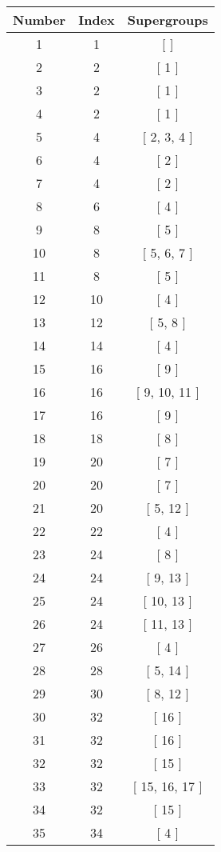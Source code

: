 \begin{center}
\begin{longtable}[H]{|| c c c ||}
\hline
Number & Index & Supergroups \\ 
\hline
1 & 1 & [  ] \\ 
\hline
2 & 2 & [ 1 ] \\ 
\hline
3 & 2 & [ 1 ] \\ 
\hline
4 & 2 & [ 1 ] \\ 
\hline
5 & 4 & [ 2, 3, 4 ] \\ 
\hline
6 & 4 & [ 2 ] \\ 
\hline
7 & 4 & [ 2 ] \\ 
\hline
8 & 6 & [ 4 ] \\ 
\hline
9 & 8 & [ 5 ] \\ 
\hline
10 & 8 & [ 5, 6, 7 ] \\ 
\hline
11 & 8 & [ 5 ] \\ 
\hline
12 & 10 & [ 4 ] \\ 
\hline
13 & 12 & [ 5, 8 ] \\ 
\hline
14 & 14 & [ 4 ] \\ 
\hline
15 & 16 & [ 9 ] \\ 
\hline
16 & 16 & [ 9, 10, 11 ] \\ 
\hline
17 & 16 & [ 9 ] \\ 
\hline
18 & 18 & [ 8 ] \\ 
\hline
19 & 20 & [ 7 ] \\ 
\hline
20 & 20 & [ 7 ] \\ 
\hline
21 & 20 & [ 5, 12 ] \\ 
\hline
22 & 22 & [ 4 ] \\ 
\hline
23 & 24 & [ 8 ] \\ 
\hline
24 & 24 & [ 9, 13 ] \\ 
\hline
25 & 24 & [ 10, 13 ] \\ 
\hline
26 & 24 & [ 11, 13 ] \\ 
\hline
27 & 26 & [ 4 ] \\ 
\hline
28 & 28 & [ 5, 14 ] \\ 
\hline
29 & 30 & [ 8, 12 ] \\ 
\hline
30 & 32 & [ 16 ] \\ 
\hline
31 & 32 & [ 16 ] \\ 
\hline
32 & 32 & [ 15 ] \\ 
\hline
33 & 32 & [ 15, 16, 17 ] \\ 
\hline
34 & 32 & [ 15 ] \\ 
\hline
35 & 34 & [ 4 ] \\ 
\hline

\end{longtable}
\end{center}
